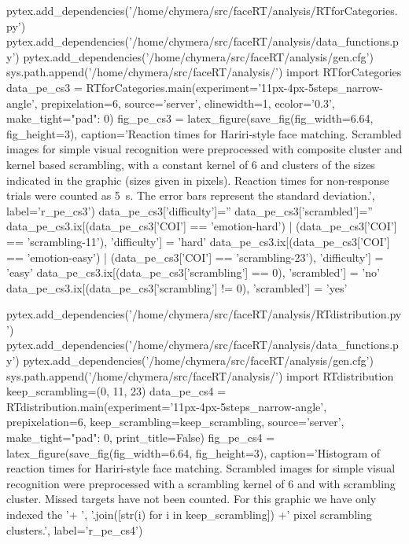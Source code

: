 \begin{pycode}[pe_cs3]
pytex.add_dependencies('/home/chymera/src/faceRT/analysis/RTforCategories.py')
pytex.add_dependencies('/home/chymera/src/faceRT/analysis/data_functions.py')
pytex.add_dependencies('/home/chymera/src/faceRT/analysis/gen.cfg')
sys.path.append('/home/chymera/src/faceRT/analysis/')
import RTforCategories
data_pe_cs3 = RTforCategories.main(experiment='11px-4px-5steps_narrow-angle', prepixelation=6, source='server', elinewidth=1, ecolor='0.3', make_tight={"pad": 0})
fig_pe_cs3 = latex_figure(save_fig(fig_width=6.64, fig_height=3), caption='Reaction times for Hariri-style face matching. Scrambled images for simple visual recognition were preprocessed with composite cluster and kernel based scrambling, with a constant kernel of \SI{6}{\pixel} and clusters of the sizes indicated in the graphic (sizes given in pixels). Reaction times for non-response trials were counted as \SI{5}{\second}. The error bars represent the standard deviation.', label='r_pe_cs3')
data_pe_cs3['difficulty']=''
data_pe_cs3['scrambled']=''
data_pe_cs3.ix[(data_pe_cs3['COI'] == 'emotion-hard') | (data_pe_cs3['COI'] == 'scrambling-11'), 'difficulty'] = 'hard'
data_pe_cs3.ix[(data_pe_cs3['COI'] == 'emotion-easy') | (data_pe_cs3['COI'] == 'scrambling-23'), 'difficulty'] = 'easy'
data_pe_cs3.ix[(data_pe_cs3['scrambling'] == 0), 'scrambled'] = 'no'
data_pe_cs3.ix[(data_pe_cs3['scrambling'] != 0), 'scrambled'] = 'yes'
\end{pycode}
\begin{pycode}[pe_cs4]
pytex.add_dependencies('/home/chymera/src/faceRT/analysis/RTdistribution.py')
pytex.add_dependencies('/home/chymera/src/faceRT/analysis/data_functions.py')
pytex.add_dependencies('/home/chymera/src/faceRT/analysis/gen.cfg')
sys.path.append('/home/chymera/src/faceRT/analysis/')
import RTdistribution
keep_scrambling=(0, 11, 23)
data_pe_cs4 = RTdistribution.main(experiment='11px-4px-5steps_narrow-angle', prepixelation=6, keep_scrambling=keep_scrambling, source='server', make_tight={"pad": 0}, print_title=False)
fig_pe_cs4 = latex_figure(save_fig(fig_width=6.64, fig_height=3), caption='Histogram of reaction times for Hariri-style face matching. Scrambled images for simple visual recognition were preprocessed with a scrambling kernel of \SI{6}{\pixel} and with scrambling cluster. Missed targets have not been counted. For this graphic we have only indexed the '+ ', '.join([str(i) for i in keep_scrambling]) +' pixel scrambling clusters.', label='r_pe_cs4')
\end{pycode}
